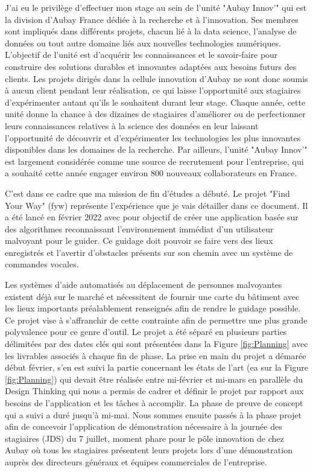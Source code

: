 \documentclass[11pt]{article}
\begin{document}
    J'ai eu le privilège d'effectuer mon stage au sein de l'unité "Aubay Innov'" qui est la division d’Aubay France dédiée 
    à la recherche et à l'innovation. Ses membres sont impliqués dans différents projets, chacun lié à la data science, l'analyse 
    de données ou tout autre domaine liés aux nouvelles technologies numériques. L'objectif de l'unité est d'acquérir 
    les connaissances et le savoir-faire pour construire des solutions durables et innovantes adaptées aux besoins futurs des clients. 
    Les projets dirigés dans la cellule innovation d'Aubay ne sont donc soumis à aucun client pendant leur réalisation, 
    ce qui laisse l'opportunité aux stagiaires d'expérimenter autant qu'ils le souhaitent durant leur stage.
    Chaque année, cette unité donne la chance à des dizaines de stagiaires d'améliorer ou de perfectionner leurs connaissances
    relatives à la science des données en leur laissant l'opportunité de découvrir et d'expérimenter les technologies les plus 
    innovantes disponibles dans les domaines de la recherche. Par ailleurs, l'unité "Aubay Innov'" est largement considérée comme 
    une source de recrutement pour l'entreprise, qui a souhaité cette année engager environ 800 nouveaux collaborateurs en France. 
    
    C'est dans ce cadre que ma mission de fin d'études a débuté. Le projet "Find Your Way" (\acrshort{fyw}) représente l'expérience que je 
    vais détailler dans ce document. Il a été lancé en février 2022 avec pour objectif de créer une application
    basée sur des algorithmes reconnaissant l'environnement immédiat d'un utilisateur malvoyant pour le guider. 
    Ce guidage doit pouvoir se faire vers des lieux enregistrés et l'avertir d'obstacles présents sur son chemin avec un système de commandes 
    vocales.     
    
    Les systèmes d'aide automatisés au déplacement de personnes malvoyantes existent déjà sur le marché et nécessitent de fournir une 
    carte du bâtiment avec les lieux importants préalablement renseignés afin de rendre le guidage possible. Ce projet vise à s'affranchir 
    de cette contrainte afin de permettre une plus grande polyvalence pour ce genre d'outil.
    Le projet a été séparé en plusieurs parties délimitées par des dates clés qui sont présentées dans la Figure \ref{fig:Planning} 
    avec les livrables associés à chaque fin de phase.
    La prise en main du projet a démarée début février, s'en est suivi la partie concernant les états de l'art (\acrshort{ea} sur la Figure \ref{fig:Planning}) 
    qui devait être réalisée entre mi-février et mi-mars en parallèle du Design Thinking qui nous a permis de cadrer et définir le projet par 
    rapport aux besoins de l'application et les tâches à accomplir. La phase de preuve de concept qui a suivi a duré jusqu'à mi-mai. 
    Nous sommes ensuite passés à la phase projet afin de concevoir l'application de démonstration nécessaire à la journée des stagiaires (JDS) 
    du 7 juillet, moment phare pour le pôle innovation de chez Aubay où tous 
    les stagiaires présentent leurs projets lors d'une démonstration auprès des directeurs généraux et équipes commerciales de l'entreprise.
\end{document}
